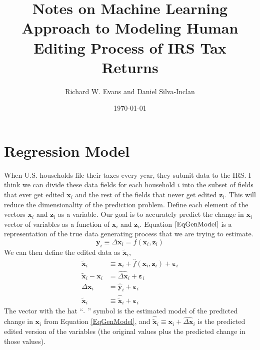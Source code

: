 \documentclass[letterpaper,12pt]{article}
\theoremstyle{definition}
\newcommand\ve{\varepsilon}
\begin{document}
\title{Notes on Machine Learning Approach to Modeling Human Editing Process of IRS Tax Returns}
\date{\today}
\author{Richard W. Evans and Daniel Silva-Inclan}
\maketitle



\section{Regression Model}\label{SecRegModel}

  When U.S. households file their taxes every year, they submit data to the IRS. I think we can divide these data fields for each household $i$ into the subset of fields that ever get edited $\bm{x}_i$ and the rest of the fields that never get edited $\bm{z}_i$. This will reduce the dimensionality of the prediction problem. Define each element of the vectors $\bm{x}_i$ and $\bm{z}_i$ as a variable. Our goal is to accurately predict the change in $\bm{x}_i$ vector of variables as a function of $\bm{x}_i$ and $\bm{z}_i$. Equation $\eqref{EqGenModel}$ is a representation of the true data generating process that we are trying to estimate.
  \begin{equation}\label{EqGenModel}
    \bm{y}_i \equiv \Delta\bm{x}_i = f\left(\bm{x}_i,  \bm{z}_i\right)
  \end{equation}
  We can then define the edited data as $\bm{\tilde{x}}_i$,
  \begin{equation}\label{EqXtilde}
    \begin{split}
      \bm{\tilde{x}}_i &\equiv \bm{x}_i + \hat{f}\left(\bm{x}_i,  \bm{z}_i\right) + \bm{\ve}_i \\
      \bm{\tilde{x}}_i - \bm{x}_i &= \widehat{\Delta\bm{x}}_i + \bm{\ve}_i \\
      \Delta\bm{x}_i &= \hat{\bm{y}}_i + \bm{\ve}_i \\
      \bm{\tilde{x}}_i &\equiv \hat{\bm{\tilde{x}}}_i + \bm{\ve}_i
    \end{split}
  \end{equation}
  The vector with the hat ``$\:\hat{\:}\:$'' symbol is the estimated model of the predicted change in $\bm{x}_i$ from Equation \eqref{EqGenModel}, and $\hat{\bm{\tilde{x}}}_i\equiv\bm{x}_i + \widehat{\Delta\bm{x}}_i$ is the predicted edited version of the variables (the original values plus the predicted change in those values).
\end{document}
